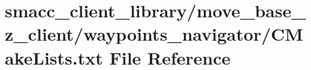 \hypertarget{client__library_2move__base__z__client_2waypoints__navigator_2CMakeLists_8txt}{}\section{smacc\+\_\+client\+\_\+library/move\+\_\+base\+\_\+z\+\_\+client/waypoints\+\_\+navigator/\+C\+Make\+Lists.txt File Reference}
\label{client__library_2move__base__z__client_2waypoints__navigator_2CMakeLists_8txt}
